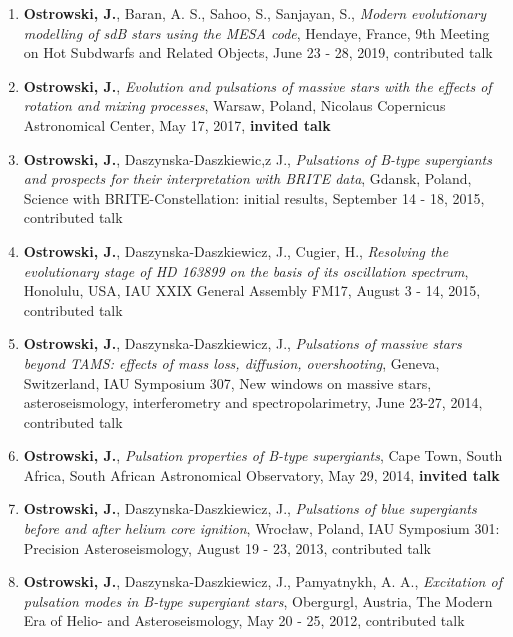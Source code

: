 \documentclass[margin, 10pt]{res} %
\begin{document}
\begin{resume}
\begin{enumerate}
    \item \textbf{Ostrowski, J.}, Baran, A. S., Sahoo, S., Sanjayan, S., \textit{Modern evolutionary modelling of sdB stars using the MESA code}, Hendaye, France, 9th Meeting on Hot Subdwarfs and Related Objects, June 23 - 28, 2019, contributed talk

    \item \textbf{Ostrowski, J.}, \textit{Evolution and pulsations of massive stars with the effects of rotation and mixing processes}, Warsaw, Poland, Nicolaus Copernicus Astronomical Center, May 17, 2017, \textbf{invited talk}

    \item \textbf{Ostrowski, J.}, Daszynska-Daszkiewic,z J., \textit{Pulsations of B-type supergiants and prospects for their interpretation with BRITE data}, Gdansk, Poland,  Science with BRITE-Constellation: initial results, September 14 - 18, 2015, contributed talk
     
    \item \textbf{Ostrowski, J.}, Daszynska-Daszkiewicz, J., Cugier, H., \textit{Resolving the evolutionary stage of HD 163899 on the basis of its oscillation spectrum}, Honolulu, USA, IAU XXIX General Assembly FM17, August 3 - 14, 2015, contributed talk

    \item \textbf{Ostrowski, J.}, Daszynska-Daszkiewicz, J., \textit{Pulsations of massive stars beyond TAMS: effects of mass loss, diffusion, overshooting}, Geneva, Switzerland, IAU Symposium 307, New windows on massive stars, asteroseismology, interferometry and spectropolarimetry, June 23-27, 2014, contributed talk

    \item \textbf{Ostrowski, J.}, \textit{Pulsation properties of B-type supergiants}, Cape Town, South Africa, South African Astronomical Observatory, May 29, 2014, \textbf{invited talk}

    \item \textbf{Ostrowski, J.}, Daszynska-Daszkiewicz, J., \textit{Pulsations of blue supergiants before and after helium core ignition}, Wroc\l{}aw, Poland, IAU Symposium 301: Precision Asteroseismology, August 19 - 23, 2013, contributed talk

    \item \textbf{Ostrowski, J.}, Daszynska-Daszkiewicz, J., Pamyatnykh, A. A., \textit{Excitation of pulsation modes in B-type supergiant stars}, Obergurgl, Austria, The Modern Era of Helio- and Asteroseismology, May 20 - 25, 2012, contributed talk
\end{enumerate}


\end{resume}
\end{document}
